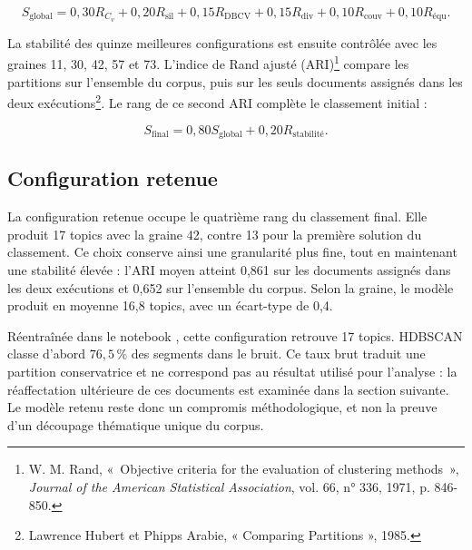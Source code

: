 \[
S_{\mathrm{global}}
=0{,}30R_{C_v}+0{,}20R_{\mathrm{sil}}+0{,}15R_{\mathrm{DBCV}}
+0{,}15R_{\mathrm{div}}+0{,}10R_{\mathrm{couv}}
+0{,}10R_{\mathrm{équ}}.
\]

La stabilité des quinze meilleures configurations est ensuite contrôlée avec les graines 11, 30, 42, 57 et 73. L'indice de Rand ajusté (ARI)\footnote{W. M. Rand, «~Objective criteria for the evaluation of clustering methods~», \textit{Journal of the American Statistical Association}, vol. 66, n° 336, 1971, p. 846-850.} compare les partitions sur l'ensemble du corpus, puis sur les seuls documents assignés dans les deux exécutions\footnote{Lawrence Hubert et Phipps Arabie, « Comparing Partitions », 1985.}. Le rang de ce second ARI complète le classement initial :

\[
S_{\mathrm{final}}
=0{,}80S_{\mathrm{global}}+0{,}20R_{\mathrm{stabilité}}.
\]

\subsection{Configuration retenue}

La configuration retenue occupe le quatrième rang du classement final. Elle produit 17 topics avec la graine 42, contre 13 pour la première solution du classement. Ce choix conserve ainsi une granularité plus fine, tout en maintenant une stabilité élevée : l'ARI moyen atteint 0,861 sur les documents assignés dans les deux exécutions et 0,652 sur l'ensemble du corpus. Selon la graine, le modèle produit en moyenne 16,8 topics, avec un écart-type de 0,4.

Réentraînée dans le notebook , cette configuration retrouve 17 topics. HDBSCAN classe d'abord \(76{,}5\,\%\) des segments dans le bruit. Ce taux brut traduit une partition conservatrice et ne correspond pas au résultat utilisé pour l'analyse : la réaffectation ultérieure de ces documents est examinée dans la section suivante. Le modèle retenu reste donc un compromis méthodologique, et non la preuve d'un découpage thématique unique du corpus.